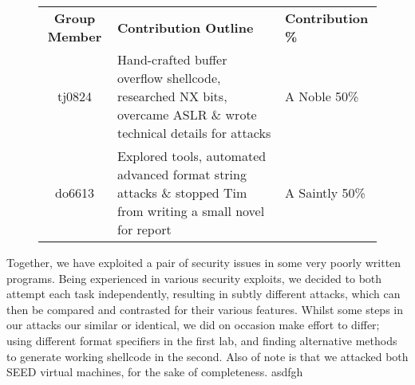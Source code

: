 \begin{figure}[h]
\centering
\begin{tabular}{|c|p{9.5cm}|l|}
\hline
{\bf Group Member} & {\bf Contribution Outline} & {\bf Contribution \%} \\
\hhline{|=|=|=|}
tj0824 & Hand-crafted buffer overflow shellcode, researched NX bits, overcame ASLR \& wrote technical details for attacks & A Noble 50\% \\
\hline
do6613 & Explored tools, automated advanced format string attacks \& stopped Tim from writing a small novel for report & A Saintly 50\% \\
\hline
\end{tabular}
\end{figure}

Together, we have exploited a pair of security issues in some very poorly written programs. Being experienced in various
security exploits, we decided to both attempt each task independently, resulting in subtly different attacks, which can
then be compared and contrasted for their various features. Whilst some steps in our attacks our similar or identical,
we did on occasion make effort to differ; using different format specifiers in the first lab, and finding alternative
methods to generate working shellcode in the second. Also of note is that we attacked both SEED virtual machines, for
the sake of completeness.
asdfgh
